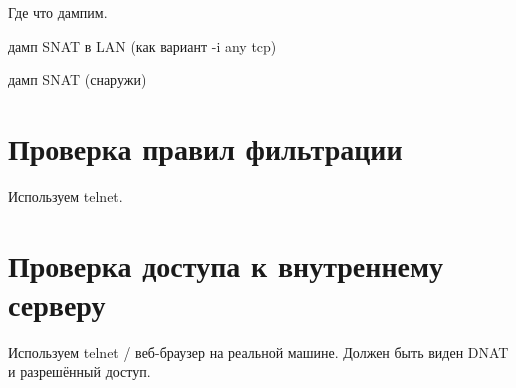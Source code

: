 \documentclass[a4paper,12pt]{article}
\begin{document}
Где что дампим.

дамп SNAT в LAN (как вариант -i any tcp)

дамп SNAT (снаружи)


\clearpage
\section{Проверка правил фильтрации}

Используем telnet.


\clearpage
\section{Проверка доступа к внутреннему серверу}

Используем telnet / веб-браузер на реальной машине. 
Должен быть виден DNAT и разрешённый доступ.
\end{document}
